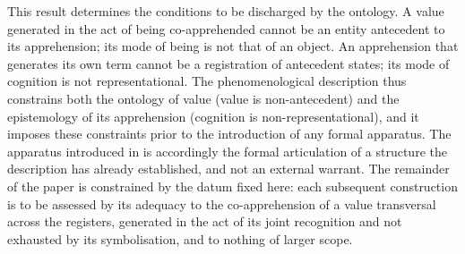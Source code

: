This result determines the conditions to be discharged by the ontology. A value generated in the act of being co-apprehended cannot be an entity antecedent to its apprehension; its mode of being is not that of an object. An apprehension that generates its own term cannot be a registration of antecedent states; its mode of cognition is not representational. The phenomenological description thus constrains both the ontology of value (value is non-antecedent) and the epistemology of its apprehension (cognition is non-representational), and it imposes these constraints prior to the introduction of any formal apparatus. The apparatus introduced in  is accordingly the formal articulation of a structure the description has already established, and not an external warrant. The remainder of the paper is constrained by the datum fixed here: each subsequent construction is to be assessed by its adequacy to the co-apprehension of a value transversal across the registers, generated in the act of its joint recognition and not exhausted by its symbolisation, and to nothing of larger scope.
